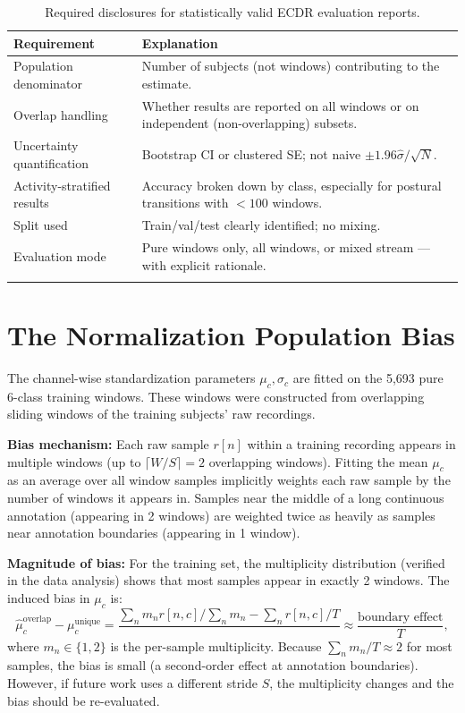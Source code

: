 \documentclass[11pt, a4paper]{article}
\theoremstyle{definition}
\theoremstyle{plain}
\begin{document}
\begin{longtable}{@{}lp{9cm}@{}}
\toprule
Requirement & Explanation \\
\midrule
Population denominator & Number of subjects (not windows) contributing to the estimate. \\
Overlap handling & Whether results are reported on all windows or on independent
                    (non-overlapping) subsets. \\
Uncertainty quantification & Bootstrap CI or clustered SE; not naive $\pm 1.96\hat{\sigma}/\sqrt{N}$. \\
Activity-stratified results & Accuracy broken down by class, especially for postural transitions
                               with $< 100$ windows. \\
Split used & Train/val/test clearly identified; no mixing. \\
Evaluation mode & Pure windows only, all windows, or mixed stream — with explicit rationale. \\
\bottomrule
\caption{Required disclosures for statistically valid ECDR evaluation reports.}
\end{longtable}

\section{The Normalization Population Bias}

The channel-wise standardization parameters $\mu_c, \sigma_c$ are fitted on the
5,693 pure 6-class training windows. These windows were constructed from overlapping
sliding windows of the training subjects' raw recordings.

\textbf{Bias mechanism:} Each raw sample $r[n]$ within a training recording appears
in multiple windows (up to $\lceil W/S \rceil = 2$ overlapping windows). Fitting
the mean $\mu_c$ as an average over all window samples implicitly weights each
raw sample by the number of windows it appears in. Samples near the middle of a
long continuous annotation (appearing in 2 windows) are weighted twice as heavily
as samples near annotation boundaries (appearing in 1 window).

\textbf{Magnitude of bias:} For the training set, the multiplicity distribution
(verified in the data analysis) shows that most samples appear in exactly 2 windows.
The induced bias in $\mu_c$ is:
\[
  \hat{\mu}_c^{\text{overlap}} - \mu_c^{\text{unique}} = \frac{\sum_n m_n r[n,c] / \sum_n m_n - \sum_n r[n,c] / T}{}
  \approx \frac{\text{boundary effect}}{T},
\]
where $m_n \in \{1, 2\}$ is the per-sample multiplicity. Because $\sum_n m_n / T \approx 2$
for most samples, the bias is small (a second-order effect at annotation boundaries).
However, if future work uses a different stride $S$, the multiplicity changes and
the bias should be re-evaluated.
\end{document}
